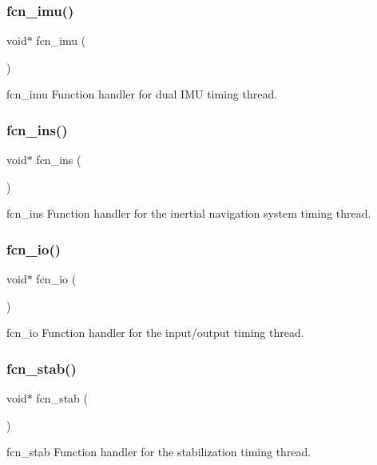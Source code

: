\subsubsection{fcn\+\_\+imu()}
{\footnotesize\ttfamily void$\ast$ fcn\+\_\+imu (\begin{DoxyParamCaption}{ }\end{DoxyParamCaption})}

fcn\+\_\+imu Function handler for dual I\+MU timing thread. \mbox{\label{timer_8h_a7dc60ec0ade92e0cd0bee93a789c6e1f}} 
\subsubsection{fcn\+\_\+ins()}
{\footnotesize\ttfamily void$\ast$ fcn\+\_\+ins (\begin{DoxyParamCaption}{ }\end{DoxyParamCaption})}

fcn\+\_\+ins Function handler for the inertial navigation system timing thread. \mbox{\label{timer_8h_a0b0c61d6fe0afdf49ff0e515f4736aab}} 
\subsubsection{fcn\+\_\+io()}
{\footnotesize\ttfamily void$\ast$ fcn\+\_\+io (\begin{DoxyParamCaption}{ }\end{DoxyParamCaption})}

fcn\+\_\+io Function handler for the input/output timing thread. \mbox{\label{timer_8h_a59c745a47943a10f5b2791c78be1d21d}} 
\subsubsection{fcn\+\_\+stab()}
{\footnotesize\ttfamily void$\ast$ fcn\+\_\+stab (\begin{DoxyParamCaption}{ }\end{DoxyParamCaption})}

fcn\+\_\+stab Function handler for the stabilization timing thread. \mbox{\label{timer_8h_ad71b9abed898e4e2569b85b760aa6f19}} 
